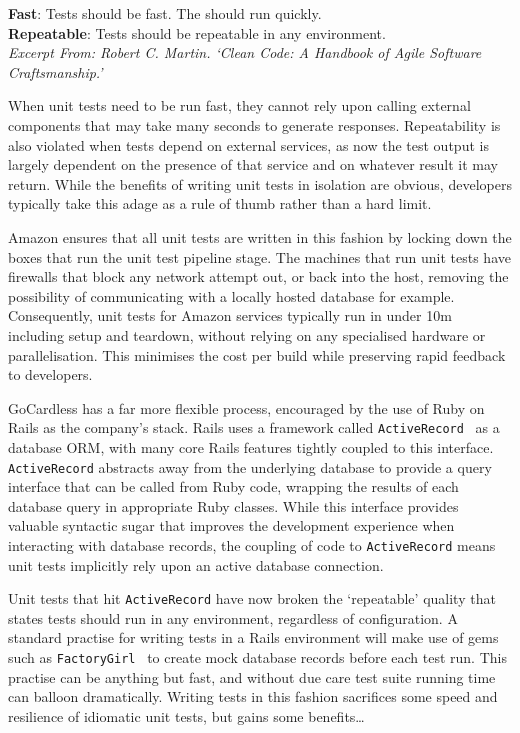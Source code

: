\documentclass[11pt]{article}
\begin{document}
\begin{displayquote}

  \textbf{Fast}: Tests should be fast. The should run quickly. \\
  \textbf{Repeatable}: Tests should be repeatable in any environment. \\

  \textit{Excerpt From: Robert C. Martin. `Clean Code: A Handbook of Agile
  Software Craftsmanship.'}

\end{displayquote}

When unit tests need to be run fast, they cannot rely upon calling external
components that may take many seconds to generate responses. Repeatability is
also violated when tests depend on external services, as now the test output is
largely dependent on the presence of that service and on whatever result it may
return. While the benefits of writing unit tests in isolation are obvious,
developers typically take this adage as a rule of thumb rather than a hard
limit.

Amazon ensures that all unit tests are written in this fashion by locking down
the boxes that run the unit test pipeline stage. The machines that run unit
tests have firewalls that block any network attempt out, or back into the host,
removing the possibility of communicating with a locally hosted database for
example. Consequently, unit tests for Amazon services typically run in under 10m
including setup and teardown, without relying on any specialised hardware or
parallelisation. This minimises the cost per build while preserving rapid
feedback to developers.

GoCardless has a far more flexible process, encouraged by the use of Ruby on
Rails as the company's stack. Rails uses a framework called
\texttt{ActiveRecord}~\cite{activeRecord} as a database ORM, with many core
Rails features tightly coupled to this interface. \texttt{ActiveRecord}
abstracts away from the underlying database to provide a query interface that
can be called from Ruby code, wrapping the results of each database query in
appropriate Ruby classes.  While this interface provides valuable syntactic
sugar that improves the development experience when interacting with database
records, the coupling of code to \texttt{ActiveRecord} means unit tests
implicitly rely upon an active database connection.

Unit tests that hit \texttt{ActiveRecord} have now broken the `repeatable'
quality that states tests should run in any environment, regardless of
configuration. A standard practise for writing tests in a Rails environment will
make use of gems such as \texttt{FactoryGirl}~\cite{factoryGirl} to create mock
database records before each test run. This practise can be anything but fast,
and without due care test suite running time can balloon dramatically. Writing
tests in this fashion sacrifices some speed and resilience of idiomatic unit
tests, but gains some benefits\dots
\end{document}
